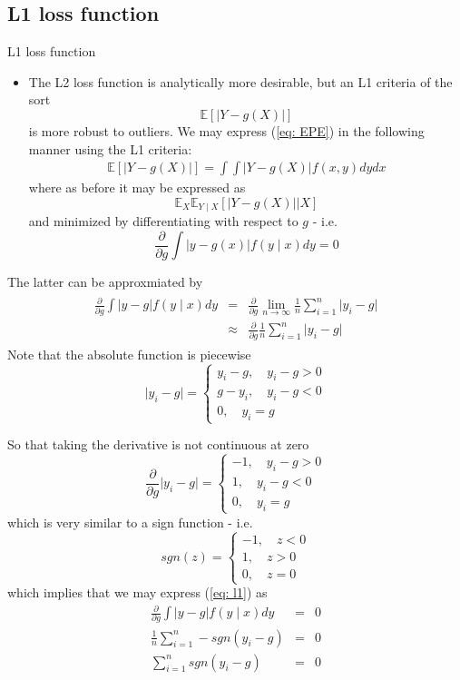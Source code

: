 \documentclass{beamer}
\newcommand{\E}{\mathbb{E}}
\begin{document}
\subsection{L1 loss function}
\begin{frame}{L1 loss function}
\begin{itemize}
\item{} The L2 loss function is analytically more desirable, but an L1 criteria of the sort
\[
\E[\lvert Y-g(X)\lvert]
\]
is more robust to outliers. We may express (\ref{eq: EPE}) in the following manner using the L1 criteria:
\begin{eqnarray*}
\E[\lvert Y-g(X)\lvert]=\int\int \lvert Y-g(X)\lvert f(x,y)dydx
\end{eqnarray*}
where as before it may be expressed as
\[
\E_X\E_{Y\mid X}[\lvert Y-g(X)\lvert\mid X]
\]
and minimized by differentiating with respect to $g$ - i.e.
\[
\frac{\partial}{\partial g}\int\lvert y-g(x)\lvert f(y\mid x)dy=0
\]
\end{itemize}
\end{frame}

\begin{frame}
The latter can be approxmiated by
\begin{eqnarray}\label{eq: l1}
\begin{split}
\frac{\partial}{\partial g}\int\lvert y-g\lvert f(y\mid x)dy&=&\frac{\partial}{\partial g}\lim_{n\rightarrow \infty}\frac{1}{n}\sum\limits_{i=1}^n\lvert y_i-g\lvert\\
&\approx&\frac{\partial}{\partial g}\frac{1}{n}\sum\limits_{i=1}^{n}\lvert y_i-g\lvert
\end{split}
\end{eqnarray}
Note that the absolute function is piecewise 
\[
\lvert y_i-g\lvert=
\begin{cases}
 y_i-g,\quad y_i-g> 0\\
g-y_i,\quad y_i-g< 0\\
0,\quad y_i=g
\end{cases}
\]
\end{frame}

\begin{frame}
So that taking the derivative is not continuous at zero
\[
\frac{\partial}{\partial g}\lvert y_i-g\lvert=
\begin{cases}
 -1,\quad y_i-g> 0\\
1,\quad y_i-g< 0\\
0,\quad y_i=g
\end{cases}
\]
which is very similar to a sign function - i.e.
\[
sgn(z)=
\begin{cases}
 -1,\quad z< 0\\
1,\quad z>0\\
0,\quad z=0
\end{cases}
\]
which implies that we may express (\ref{eq: l1}) as
\begin{eqnarray*}
\frac{\partial}{\partial g}\int\lvert y-g\lvert f(y\mid x)dy&=&0\\
\frac{1}{n}\sum\limits_{i=1}^{n}-sgn(y_i-g)&=&0\\
\sum\limits_{i=1}^{n}sgn(y_i-g)&=&0
\end{eqnarray*}
\end{frame}
\end{document}
